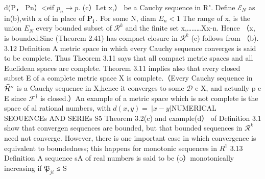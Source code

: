 d(P， Pn）<eif $p_{n}\to p.$ (c）Let {x,}） be a Cauchy sequence in R". Define ${\mathcal{E}}_{N}$ as in(b),with x of in place of $\boldsymbol{P_{i}}\,.$ For some N, diam $E_{n}<1$ The range of {x,} is the union $E_{N}$ every bounded subset of $\textstyle{\mathcal{R}}^{k}$ and the finite set {x,………Xx-n}. Hence （{x,} is bounded.Sinc (Theorem 2.41) has compact closure in $\textstyle{\mathcal{R}}^{k}$ (c) follows from （b). 3.12 Definition A metric space in which every Cauchy sequence converges is said to be complete. Thus Theorem 3.11 says that all compact metric spaces and all Euclidean spaces are complete. Theorem 3.11 implies also that every closed subset E of a complete metric space X is complete.（Every Cauchy sequence in $\widehat{\cal H}^{\nu}$ is a Cauchy sequence in X,hence it converges to some $\textstyle{\mathcal{D}}$ e X, and actually p e E since ${\mathcal{F}}^{\dagger}$ is closed.）An example of a metric space which is not complete is the space of al rational numbers, with $d(x,y)=\ |x-y|$NUMERICAL SEOUENCEs AND SERIEs S5 Theorem 3.2(c) and example(d） of Definition 3.1 show that convergen sequences are bounded, but that bounded sequences in $\textstyle{\mathcal{R}}^{k}$ need not converge. However, there is one important case in which convergence is equivalent to boundedness; this happens for monotonic sequences in $R^{1}$ 3.13 Definition A sequence {sA} of real numbers is said to be (o）monotonically increasing if ${\mathfrak{P}}_{j i}$ ≤ S%